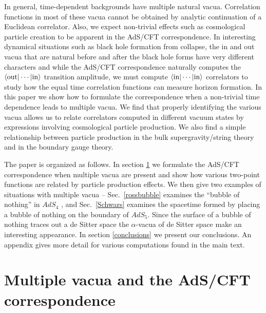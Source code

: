 \documentclass[a4paper,aps,prd,preprintnumbers,groupedaddress]{revtex4}
\begin{document}
In general, time-dependent backgrounds have multiple natural vacua.  Correlation functions in most of these vacua cannot be
obtained by analytic continuation of a Euclidean correlator.
Also, we expect non-trivial effects such as cosmological particle creation
to be apparent in the AdS/CFT correspondence. 
In interesting dynamical situations such as black hole formation from collapse, the in and out vacua that are natural before and after the black hole forms have very different characters and while the AdS/CFT correspondence naturally computes the $\langle \rm{out} | \cdots | \rm{in} \rangle$ transition amplitude,  we must compute $\langle \rm{in}| \cdots | \rm{in} \rangle$ correlators to study how the equal time correlation functions can measure horizon formation.  In this paper we show how to formulate the correspondence when a non-trivial time dependence
leads to multiple vacua. We find that properly identifying the various vacua allows us to relate correlators computed in different vacuum
states by expressions involving cosmological particle production. We also find a simple relationship between particle production in the bulk
supergravity/string theory and in the boundary gauge theory.

The paper is organized as follows. In section \ref{ads-cft} we formulate the AdS/CFT correspondence when multiple vacua are present and show how various two-point functions are related by particle production effects.   We then give two examples of situations with multiple vacua -- Sec.~\ref{rossbubble} examines the ``bubble of nothing'' in  $AdS_4$ \cite{birm,vijayross}, and Sec.~\ref{Schwars} examines the spacetime formed by placing a bubble of nothing on the boundary of $AdS_5$.
Since the surface of a bubble of nothing traces out a de Sitter space  the
 $\alpha$-vacua of de Sitter space make an interesting appearance.
In section \ref{conclusions} we present our conclusions. An appendix gives more detail for
various computations found in the main text.

\section{Multiple vacua and the AdS/CFT correspondence} \label{ads-cft}
\end{document}
